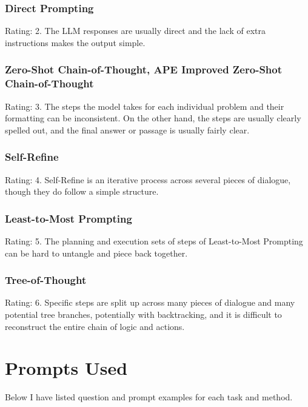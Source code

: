 \documentclass[11pt]{article}
\begin{document}
\subsubsection*{Direct Prompting}

Rating: 2. The LLM responses are usually direct and the lack of extra instructions makes the output simple. 

\subsubsection*{Zero-Shot Chain-of-Thought, APE Improved Zero-Shot Chain-of-Thought}

Rating: 3. The steps the model takes for each individual problem and their formatting can be inconsistent. On the other hand, the steps are usually clearly spelled out, and the final answer or passage is usually fairly clear.

\subsubsection*{Self-Refine}

Rating: 4. Self-Refine is an iterative process across several pieces of dialogue, though they do follow a simple structure.

\subsubsection*{Least-to-Most Prompting}

Rating: 5. The planning and execution sets of steps of Least-to-Most Prompting can be hard to untangle and piece back together.

\subsubsection*{Tree-of-Thought}

Rating: 6. Specific steps are split up across many pieces of dialogue and many potential tree branches, potentially with backtracking, and it is difficult to reconstruct the entire chain of logic and actions.

\clearpage
\newpage

\section{Prompts Used}
\label{sec:prompts}

Below I have listed question and prompt examples for each task and method.
\end{document}
